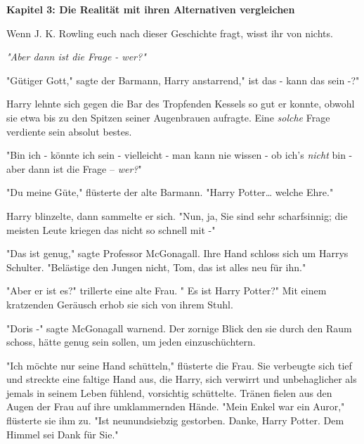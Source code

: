 

\hypertarget{die-realituxe4t-mit-ihren-alternativen-vergleichen}{%

\textbf{Kapitel 3: Die Realität mit ihren Alternativen vergleichen}

Wenn J. K. Rowling euch nach dieser Geschichte fragt, wisst ihr von nichts.

\later

\emph{"Aber dann ist die Frage - wer?"}

\later

"Gütiger Gott," sagte der Barmann, Harry anstarrend," ist das - kann das sein -?"

Harry lehnte sich gegen die Bar des Tropfenden Kessels so gut er konnte, obwohl sie etwa bis zu den Spitzen seiner Augenbrauen aufragte. Eine \emph{solche} Frage verdiente sein absolut bestes.

"Bin ich - könnte ich sein - vielleicht - man kann nie wissen - ob ich's \emph{nicht} bin - aber dann ist die Frage -- \emph{wer?}"

"Du meine Güte," flüsterte der alte Barmann. "Harry Potter… welche Ehre."

Harry blinzelte, dann sammelte er sich. "Nun, ja, Sie sind sehr scharfsinnig; die meisten Leute kriegen das nicht so schnell mit -"

"Das ist genug," sagte Professor McGonagall. Ihre Hand schloss sich um Harrys Schulter. "Belästige den Jungen nicht, Tom, das ist alles neu für ihn."

"Aber er ist es?" trillerte eine alte Frau. " Es ist Harry Potter?" Mit einem kratzenden Geräusch erhob sie sich von ihrem Stuhl.

"Doris -" sagte McGonagall warnend. Der zornige Blick den sie durch den Raum schoss, hätte genug sein sollen, um jeden einzuschüchtern.

"Ich möchte nur seine Hand schütteln," flüsterte die Frau. Sie verbeugte sich tief und streckte eine faltige Hand aus, die Harry, sich verwirrt und unbehaglicher als jemals in seinem Leben fühlend, vorsichtig schüttelte. Tränen fielen aus den Augen der Frau auf ihre umklammernden Hände. "Mein Enkel war ein Auror," flüsterte sie ihm zu. "Ist neunundsiebzig gestorben. Danke, Harry Potter. Dem Himmel sei Dank für Sie."

}
